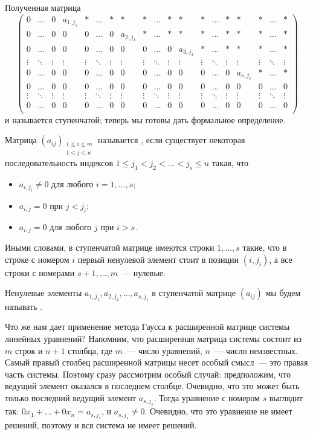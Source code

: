 Полученная матрица
$$
\left(
\begin{array}{ccccccccccccccccccc}
0&\dots&0&a_{1,j_1}&*& \dots & * & * & * & \dots &*&*&*&\dots&*&*&*&\dots&*\\
0 & \dots & 0 & 0 & 0 & \dots & 0 & a_{2,j_2} & * & \dots &*&*&*&\dots&*&*&*&\dots&*\\
0 & \dots & 0 & 0 & 0 & \dots & 0 & 0 & 0 & \dots & 0 & a_{3,j_3}&*&\dots&*&*&*&\dots&*\\ 
\vdots&\ddots&\vdots&\vdots&\vdots&\ddots&\vdots&\vdots&\vdots&\ddots&\vdots&\vdots&\vdots&\ddots&\vdots&\vdots&\vdots&\ddots&\vdots\\
0&\dots&0&0&0&\dots&0&0&0&\dots&0&0&0&\dots&0&a_{s,j_s}&*&\dots&*\\
0&\dots&0&0&0&\dots&0&0&0&\dots&0&0&0&\dots&0&0&0&\dots&0\\
\vdots&\ddots&\vdots&\vdots&\vdots&\ddots&\vdots&\vdots&\vdots&\ddots&\vdots&\vdots&\vdots&\ddots&\vdots&\vdots&\vdots&\ddots&\vdots\\
0&\dots&0&0&0&\dots&0&0&0&\dots&0&0&0&\dots&0&0&0&\dots&0\\
\end{array}\right)
$$
и называется ступенчатой; теперь мы готовы дать
формальное определение.

\begin{definition}
Матрица $(a_{ij})_{\substack{1\leq i\leq m\\1\leq j\leq n}}$
называется , если существует некоторая
последовательность индексов $1\leq j_1<j_2<\dots<j_s\leq n$ такая, что
\begin{itemize}
\item $a_{i,j_i}\neq 0$ для любого $i=1,\dots,s$;
\item $a_{i,j}=0$ при $j<j_i$;
\item $a_{i,j}=0$ для любого $j$ при $i>s$.
\end{itemize}
\end{definition}


Иными словами, в ступенчатой матрице имеются строки $1,\dots,s$ такие,
что в строке с номером $i$ первый ненулевой элемент стоит в позиции
$(i,j_i)$, а все строки с номерами $s+1,\dots,m$~--- нулевые.

Ненулевые элементы $a_{1,j_1}, a_{2,j_2},\dots,a_{s,j_s}$ в
ступенчатой матрице $(a_{ij})$ мы будем
называть .

Что же нам дает применение метода Гаусса к расширенной матрице системы
линейных уравнений? Напомним, что расширенная матрица системы состоит
из $m$ строк и $n+1$ столбца, где $m$~--- число уравнений, $n$~---
число неизвестных. Самый правый столбец расширенной матрицы несет
особый смысл~--- это правая часть системы. Поэтому сразу рассмотрим
особый случай: предположим, что ведущий элемент оказался в последнем
столбце. Очевидно, что это может быть только последний ведущий элемент
$a_{s,j_s}$. Тогда уравнение с номером $s$ выглядит так:
$0x_1+\dots+0x_n=a_{s,j_s}$, и $a_{s,j_s}\neq 0$. Очевидно, что это
уравнение не имеет решений, поэтому и вся система не имеет решений.

